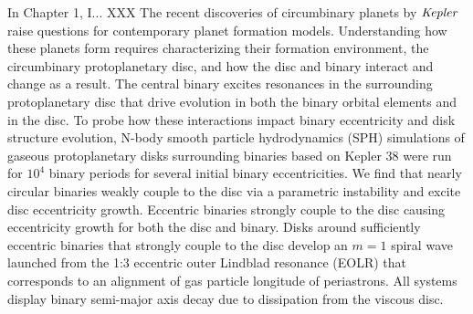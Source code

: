 In Chapter 1, I... XXX
The recent discoveries of circumbinary planets by $\it Kepler$ raise questions for contemporary planet formation
models.  Understanding how these planets form requires characterizing their formation environment, the circumbinary protoplanetary disc,
and how the disc and binary interact and change as a result.  The central binary excites resonances in the surrounding
protoplanetary disc that drive evolution in both the binary orbital elements and in the
disc.  To probe how these interactions impact binary eccentricity and disk structure evolution, N-body smooth particle
hydrodynamics (SPH) simulations of gaseous protoplanetary disks
surrounding binaries based on Kepler 38 were run for $10^4$ binary
periods for several initial binary eccentricities.  We find that
nearly circular binaries weakly couple to the disc via a parametric
instability and excite disc eccentricity growth.  Eccentric binaries strongly couple to the disc
causing eccentricity growth for both the disc and binary.
Disks around sufficiently eccentric binaries that strongly couple to the disc develop an
$m = 1$ spiral wave launched from the 1:3 eccentric outer Lindblad
resonance (EOLR) that corresponds to an alignment of gas
particle longitude of periastrons. All systems display binary semi-major axis decay due to dissipation from the
viscous disc. 



